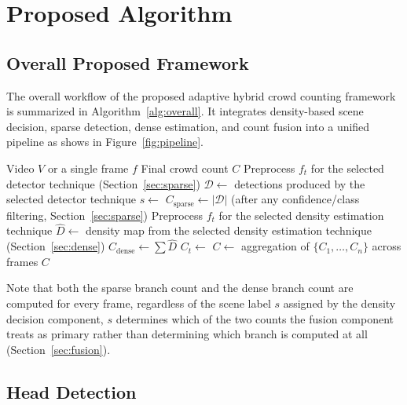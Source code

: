 \section{Proposed Algorithm}
\label{sec:proposed-algorithm}

\subsection{Overall Proposed Framework}

The overall workflow of the proposed adaptive hybrid crowd counting framework is summarized in Algorithm~\ref{alg:overall}. It integrates density-based scene decision, sparse detection, dense estimation, and count fusion into a unified pipeline as shows in Figure~\ref{fig:pipeline}.

\begin{algorithm}[H]
	\caption{Adaptive Hybrid Crowd Counting}
	\label{alg:overall}
	\begin{algorithmic}[1]
		\Require Video $V$ or a single frame $f$
		\Ensure Final crowd count $C$
		\State Preprocess $f_t$ for the selected detector technique (Section~\ref{sec:sparse})
		\State $\mathcal{D} \gets$ detections produced by the selected detector technique
		\State $s \gets$  
		\State $C_{\text{sparse}} \gets |\mathcal{D}|$ (after any confidence/class filtering, Section~\ref{sec:sparse})
		\State Preprocess $f_t$ for the selected density estimation technique
		\State $\hat D \gets$ density map from the selected density estimation technique (Section~\ref{sec:dense})
		\State $C_{\text{dense}} \gets \sum \hat D$ 
		\State $C_t \gets$  
		\EndFor
		\State $C \gets$ aggregation of $\{C_1,\dots,C_n\}$ across frames 
		\State \Return $C$
	\end{algorithmic}
\end{algorithm}

Note that both the sparse branch count and the dense branch count are computed for every frame, regardless of the scene label $s$ assigned by the density decision component, $s$ determines which of the two counts the fusion component treats as primary rather than determining which branch is computed at all (Section~\ref{sec:fusion}).

\subsection{Head Detection}
\label{sec:sparse-detection}

